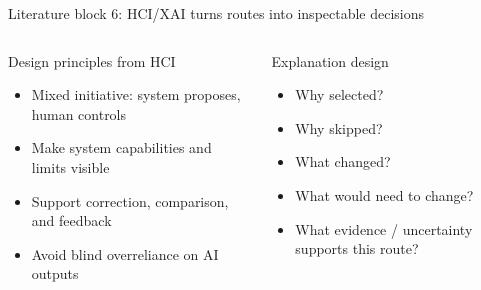 \documentclass[aspectratio=169,10pt]{beamer}
\newcommand{\smallcite}[1]{\vspace{0.15em}{\footnotesize\textcolor{DarkGray}{#1}}}
\begin{document}
\begin{frame}{Literature block 6: HCI/XAI turns routes into inspectable decisions}
\begin{columns}[T,onlytextwidth]
\begin{block}{Design principles from HCI}
\begin{itemize}
  \item Mixed initiative: system proposes, human controls
  \item Make system capabilities and limits visible
  \item Support correction, comparison, and feedback
  \item Avoid blind overreliance on AI outputs
\end{itemize}
\smallcite{Horvitz 1999; Amershi et al. 2019; Bucinca et al. 2021}
\end{block}

\begin{block}{Explanation design}
\begin{itemize}
  \item Why selected?
  \item Why skipped?
  \item What changed?
  \item What would need to change?
  \item What evidence / uncertainty supports this route?
\end{itemize}
\smallcite{Tintarev and Masthoff; Chatti et al. 2024; CityHood 2025; TRACE 2026}
\end{block}
\end{columns}
\end{frame}
\end{document}
